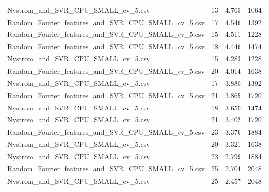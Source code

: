 \begin{tabularx}{\textwidth}{lrrr}
                Nystrom\_and\_SVR\_CPU\_SMALL\_cv\_5.csv &       13 &    4.765 &          1064 \\
Random\_Fourier\_features\_and\_SVR\_CPU\_SMALL\_cv\_5.csv &       17 &    4.546 &          1392 \\
Random\_Fourier\_features\_and\_SVR\_CPU\_SMALL\_cv\_5.csv &       15 &    4.511 &          1228 \\
Random\_Fourier\_features\_and\_SVR\_CPU\_SMALL\_cv\_5.csv &       18 &    4.446 &          1474 \\
                Nystrom\_and\_SVR\_CPU\_SMALL\_cv\_5.csv &       15 &    4.283 &          1228 \\
Random\_Fourier\_features\_and\_SVR\_CPU\_SMALL\_cv\_5.csv &       20 &    4.014 &          1638 \\
                Nystrom\_and\_SVR\_CPU\_SMALL\_cv\_5.csv &       17 &    3.880 &          1392 \\
Random\_Fourier\_features\_and\_SVR\_CPU\_SMALL\_cv\_5.csv &       21 &    3.865 &          1720 \\
                Nystrom\_and\_SVR\_CPU\_SMALL\_cv\_5.csv &       18 &    3.650 &          1474 \\
                Nystrom\_and\_SVR\_CPU\_SMALL\_cv\_5.csv &       21 &    3.402 &          1720 \\
Random\_Fourier\_features\_and\_SVR\_CPU\_SMALL\_cv\_5.csv &       23 &    3.376 &          1884 \\
                Nystrom\_and\_SVR\_CPU\_SMALL\_cv\_5.csv &       20 &    3.321 &          1638 \\
                Nystrom\_and\_SVR\_CPU\_SMALL\_cv\_5.csv &       23 &    2.799 &          1884 \\
Random\_Fourier\_features\_and\_SVR\_CPU\_SMALL\_cv\_5.csv &       25 &    2.704 &          2048 \\
                Nystrom\_and\_SVR\_CPU\_SMALL\_cv\_5.csv &       25 &    2.457 &          2048 \\
\bottomrule
\end{tabularx}
